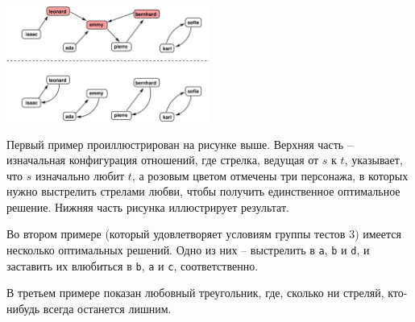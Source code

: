 \section*{\sampleexplanations}

\begin{center}
\includegraphics[width=0.5\textwidth]{polygonfig.pdf}
\end{center}

Первый пример проиллюстрирован на рисунке выше. Верхняя часть -- изначальная конфигурация отношений, где стрелка, ведущая от $s$ к $t$, указывает, что $s$ изначально любит $t$, а розовым цветом отмечены три персонажа, в которых нужно выстрелить стрелами любви, чтобы получить единственное оптимальное решение. Нижняя часть рисунка иллюстрирует результат.

Во втором примере (который удовлетворяет условиям группы тестов 3) имеется несколько оптимальных решений. Одно из них -- выстрелить в \texttt{a}, \texttt{b} и \texttt{d},
и заставить их влюбиться в \texttt{b}, \texttt{a} и \texttt{c}, соответственно.

В третьем примере показан любовный треугольник, где, сколько ни стреляй, кто-нибудь всегда останется лишним.
